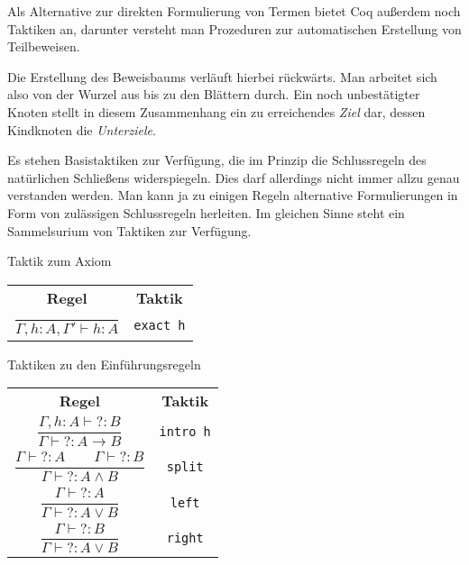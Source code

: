 \documentclass[8pt]{beamer}
\newcommand{\strong}[1]{\textsf{\textbf{#1}}}
\newcommand{\parspace}{\vspace{0.8em}}
\newcommand{\unres}{{?}}
\begin{document}
\begin{frame}
Als Alternative zur direkten Formulierung von Termen bietet Coq
außerdem noch Taktiken an, darunter versteht man Prozeduren zur
automatischen Erstellung von Teilbeweisen.\pause

\parspace
Die Erstellung des Beweisbaums verläuft hierbei rückwärts.
Man arbeitet sich also von der Wurzel aus bis zu den Blättern durch.
Ein noch unbestätigter Knoten stellt in diesem Zusammenhang ein zu
erreichendes \emph{Ziel} dar, dessen Kindknoten die \emph{Unterziele}.

\parspace
Es stehen Basistaktiken zur Verfügung, die im Prinzip die Schlussregeln
des natürlichen Schließens widerspiegeln. Dies darf allerdings nicht
immer allzu genau verstanden werden. Man kann ja zu einigen Regeln
alternative Formulierungen in Form von zulässigen Schlussregeln herleiten.
Im gleichen Sinne steht ein Sammelsurium von Taktiken zur Verfügung.
\end{frame}

\begin{frame}
\begin{block}{Taktik zum Axiom}
\begin{center}
\begin{tabular}{c@{\qquad\quad}c}
\strong{Regel} & \strong{Taktik}\\[6pt]
$\dfrac{}{\Gamma, h\colon A, \Gamma'\vdash h\colon A}$
& \texttt{exact h}
\end{tabular}
\end{center}
\end{block}
\end{frame}

\begin{frame}
\begin{block}{Taktiken zu den Einführungsregeln}
\begin{center}
\begin{tabular}{c@{\qquad\quad}c}
\strong{Regel} & \strong{Taktik}\\[6pt]
$\dfrac{\Gamma, h\colon A\vdash\unres\colon B}{\Gamma\vdash\unres\colon A\to B}$
& \texttt{intro h}\\[14pt]
$\dfrac{\Gamma\vdash\unres\colon A\qquad\Gamma\vdash\unres\colon B}
  {\Gamma\vdash\unres\colon A\land B}$
& \texttt{split}\\[14pt]
$\dfrac{\Gamma\vdash\unres\colon A}{\Gamma\vdash\unres\colon A\lor B}$
& \texttt{left}\\[14pt]
$\dfrac{\Gamma\vdash\unres\colon B}{\Gamma\vdash\unres\colon A\lor B}$
& \texttt{right}
\end{tabular}
\end{center}
\end{block}
\end{frame}
\end{document}
